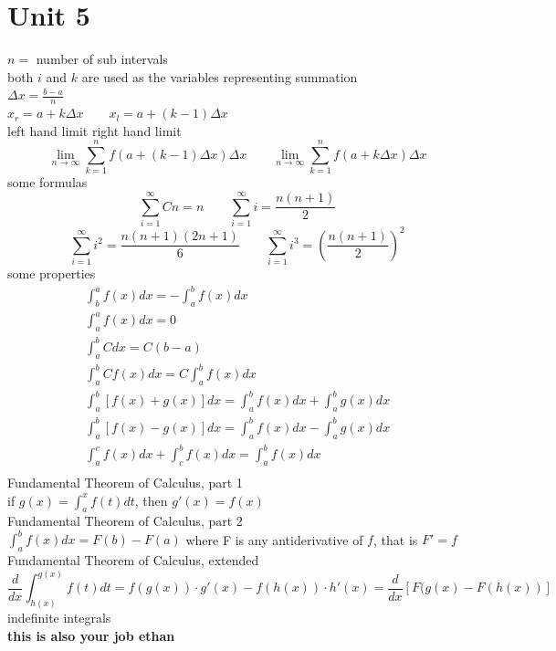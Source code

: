 \documentclass{article}
\begin{document}
\section*{Unit 5}
$n = $ number of sub intervals \\
both $i$ and $k$ are used as the variables representing summation \\
$\Delta x = \frac{b - a}{n}$ \\
$x_r = a+k\Delta x \qquad x_l = a+(k-1)\Delta x$ \\
\newline
\hfill left hand limit \hfill right hand limit \hfill
\hfill \[ \lim_{n\to\infty} \sum_{k=1}^{n} f(a + (k-1)\Delta x) \Delta x \qquad \lim_{n\to\infty} \sum_{k=1}^{n} f(a + k\Delta x) \Delta x \] \hfill 
some formulas \\
\[ \sum_{i=1}^{\infty}Cn = n \qquad \sum_{i=1}^{\infty}i = \frac{n(n+1)}{2} \]
\[ \sum_{i=1}^{\infty}i^2 = \frac{n(n+1)(2n+1)}{6} \qquad \sum_{i=1}^{\infty}i^3 = \left( \frac{n(n+1)}{2} \right)^2 \]
\newline
some properties \\
\begin{gather}
    \int_{b}^{a} f(x)dx = -\int_{a}^{b} f(x)dx \\
    \int_{a}^{a} f(x)dx = 0 \\
    \int_{a}^{b} Cdx = C(b-a) \\
    \int_{a}^{b} Cf(x)dx = C\int_{a}^{b} f(x)dx \\
    \int_{a}^{b} [f(x) + g(x)]dx = \int_{a}^{b} f(x)dx + \int_{a}^{b} g(x)dx \\
    \int_{a}^{b} [f(x) - g(x)]dx = \int_{a}^{b} f(x)dx - \int_{a}^{b} g(x)dx \\
    \int_{a}^{c} f(x)dx + \int_{c}^{b} f(x)dx = \int_{a}^{b} f(x)dx \\    
\end{gather}
\newline
Fundamental Theorem of Calculus, part 1 \\
if $g(x) = \int_{a}^{x}f(t)dt$, then $g'(x) = f(x)$ \\
\newline
Fundamental Theorem of Calculus, part 2 \\
$\int_{a}^{b}f(x)dx = F(b) - F(a)$ where F is any antiderivative of $f$, that is $F' = f$ \\
\newline
Fundamental Theorem of Calculus, extended \\
\begin{equation*}
    \frac{d}{dx} \int_{h(x)}^{g(x)} f(t)dt = f(g(x))\cdot g'(x) - f(h(x))\cdot h'(x) = \frac{d}{dx} [F(g(x)-F(h(x))]
\end{equation*}
indefinite integrals \\
\textbf{this is also your job ethan} \\
\end{document}
